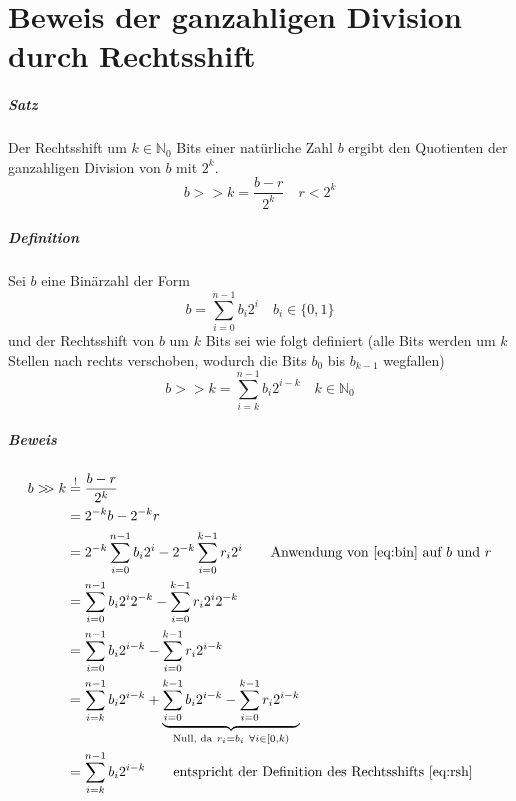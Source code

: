 \chapter{Beweis der ganzahligen Division durch Rechtsshift}
\label{proof-division}
\writtenby{\dcauthornameewie}%
\paragraph{Satz}
Der Rechtsshift um $k\in\mathbb{N}_0$ Bits einer natürliche Zahl $b$ ergibt den Quotienten der ganzahligen Division von $b$ mit $2^k$.
\begin{equation}
  b >\!\!> k = \frac{b-r}{2^k} \quad r < 2^k
\end{equation}

\paragraph{Definition}
Sei $b$ eine Binärzahl der Form
\begin{equation}
  \label{eq:bin}
  b = \sum_{i=0}^{n-1} b_i 2^i \quad b_i \in \{0,1\}
\end{equation}
und der Rechtsshift von $b$ um $k$ Bits sei wie folgt definiert (alle Bits werden um $k$ Stellen nach rechts verschoben, wodurch die Bits $b_0$ bis $b_{k-1}$ wegfallen)
\begin{equation}
  \label{eq:rsh}
  b >\!\!> k = \sum_{i=k}^{n-1} b_i 2^{i-k} \quad k \in \mathbb{N}_0
\end{equation}

\paragraph{Beweis}
\begin{align*}
  b >\!\!> k &\overset{!}{=} \frac{b-r}{2^k}  \\
    &= 2^{-k} b - 2^{-k} r \\
    &= 2^{-k} \sum_{i=0}^{n-1} b_i 2^i - 2^{-k} \sum_{i=0}^{k-1} r_i 2^i
      \tag*{Anwendung von \eqref{eq:bin} auf $b$ und $r$} \\
    &= \sum_{i=0}^{n-1} b_i 2^i 2^{-k} - \sum_{i=0}^{k-1} r_i 2^i 2^{-k} \\
    &= \sum_{i=0}^{n-1} b_i 2^{i-k} - \sum_{i=0}^{k-1} r_i 2^{i-k} \\
    &= \sum_{i=k}^{n-1} b_i 2^{i-k} + \underbrace{\sum_{i=0}^{k-1} b_i 2^{i-k} - \sum_{i=0}^{k-1} r_i 2^{i-k}}_{\text{Null, da}~ r_i = b_i~\forall i \in [0,k)} \\
    &= \sum_{i=k}^{n-1} b_i 2^{i-k}
      \tag*{entspricht der Definition des Rechtsshifts \eqref{eq:rsh}}
\end{align*}
\hfill \qedsymbol
